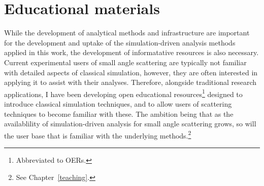 \section{Educational materials}
While the development of analytical methods and infrastructure are important for the development and uptake of the simulation-driven analysis methods applied in this work, the development of informatative resources is also necessary.
Current experimental users of small angle scattering are typically not familiar with detailed aspects of classical simulation, however, they are often interested in applying it to assist with their analyses.
Therefore, alongside traditional research applications, I have been developing open educational resources\footnote{Abbreviated to OERs.} designed to introduce classical simulation techniques, and to allow users of scattering techniques to become familiar with these.
The ambition being that as the availablility of simulation-driven analysis for small angle scattering grows, so will the user base that is familiar with the underlying methods.\footnote{See Chapter~\ref{teaching}.}
